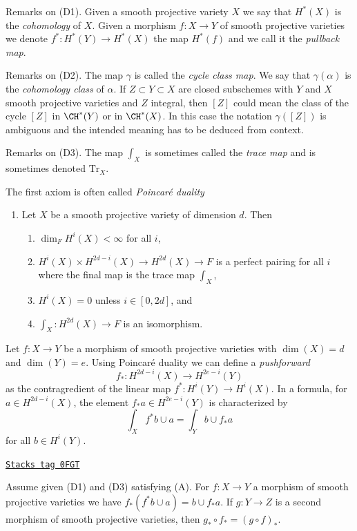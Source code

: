 \medskip\noindent
Remarks on (D1). Given a smooth projective variety $X$
we say that $H^*(X)$ is the {\it cohomology} of $X$. Given a morphism
$f : X \to Y$ of smooth projective varieties we denote
$f^* : H^*(Y) \to H^*(X)$ the map $H^*(f)$ and we call it the
{\it pullback map}.

\medskip\noindent
Remarks on (D2). The map $\gamma$ is called the {\it cycle class map}.
We say that $\gamma(\alpha)$ is the {\it cohomology class} of $\alpha$.
If $Z \subset Y \subset X$ are closed subschemes with $Y$ and $X$
smooth projective varieties and $Z$ integral, then $[Z]$ could
mean the class of the cycle $[Z]$ in $\CH^*(Y)$ or in $\CH^*(X)$.
In this case the notation $\gamma([Z])$ is ambiguous and the intended meaning
has to be deduced from context.

\medskip\noindent
Remarks on (D3). The map $\int_X$ is sometimes called the
{\it trace map} and is sometimes denoted $\text{Tr}_X$.

\medskip\noindent
The first axiom is often called {\it Poincar\'e duality}
\begin{enumerate}
\item[(A)] Let $X$ be a smooth projective variety of dimension $d$. Then
\begin{enumerate}
\item $\dim_F H^i(X) < \infty$ for all $i$,
\item $H^i(X) \times H^{2d - i}(X) \rightarrow H^{2d}(X) \rightarrow F$
is a perfect pairing for all $i$ where the final
map is the trace map $\int_X$,
\item $H^i(X) = 0$ unless $i \in [0, 2d]$, and
\item $\int_X : H^{2d}(X) \to F$ is an isomorphism.
\end{enumerate}
\end{enumerate}
Let $f : X \to Y$ be a morphism of smooth projective varieties
with $\dim(X) = d$ and $\dim(Y) = e$. Using Poincar\'e duality
we can define a {\it pushforward}
$$
f_* : H^{2d - i}(X) \longrightarrow H^{2e - i}(Y)
$$
as the contragredient of the linear map $f^* : H^i(Y) \to H^i(X)$. In a
formula, for $a \in H^{2d - i}(X)$, the element $f_*a \in H^{2e - i}(Y)$
is characterized by
$$
\int_X f^*b \cup a = \int_Y b \cup f_*a
$$
for all $b \in H^i(Y)$.

\begin{lemma}
\label{weil-lemma-pushforward-classical}
\href{https://stacks.math.columbia.edu/tag/0FGT}{\texttt{Stacks tag 0FGT}}

Assume given (D1) and (D3) satisfying (A). For $f : X \to Y$
a morphism of smooth projective varieties we have
$f_*(f^*b \cup a) = b \cup f_*a$. If $g : Y \to Z$ is a second morphism
of smooth projective varieties, then $g_* \circ f_* = (g \circ f)_*$.
\end{lemma}

